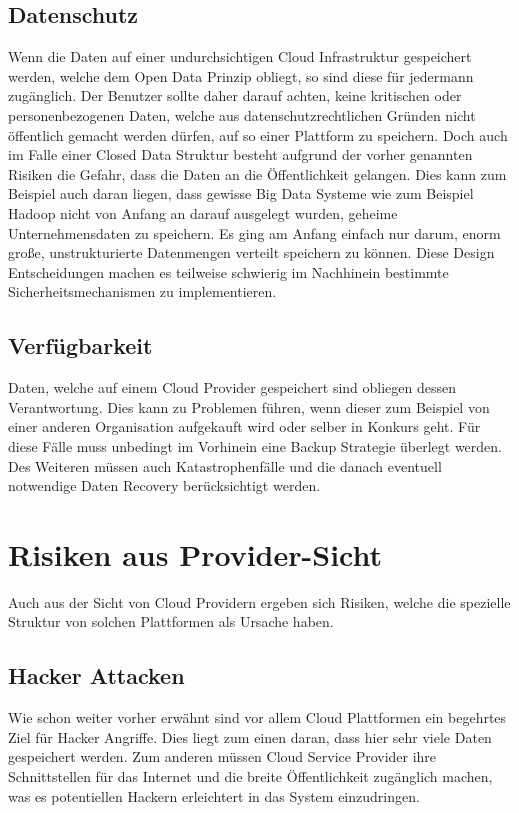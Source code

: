 \documentclass[a4paper,11pt]{article}
\begin{document}
\subsection{Datenschutz}
Wenn die Daten auf einer undurchsichtigen Cloud Infrastruktur gespeichert werden, welche dem Open Data Prinzip obliegt, so sind diese für jedermann zugänglich. Der Benutzer sollte daher darauf achten, keine kritischen oder personenbezogenen Daten, welche aus datenschutzrechtlichen Gründen nicht öffentlich gemacht werden dürfen, auf so einer Plattform zu speichern. Doch auch im Falle einer Closed Data Struktur besteht aufgrund der vorher genannten Risiken die Gefahr, dass die Daten an die Öffentlichkeit gelangen. Dies kann zum Beispiel auch daran liegen, dass gewisse Big Data Systeme wie zum Beispiel Hadoop nicht von Anfang an darauf ausgelegt wurden, geheime Unternehmensdaten zu speichern. Es ging am Anfang einfach nur darum, enorm große, unstrukturierte Datenmengen verteilt speichern zu können. Diese Design Entscheidungen machen es teilweise schwierig im Nachhinein bestimmte Sicherheitsmechanismen zu implementieren. \cite{haa2013}

\subsection{Verfügbarkeit}
Daten, welche auf einem Cloud Provider gespeichert sind obliegen dessen Verantwortung. Dies kann zu Problemen führen, wenn dieser zum Beispiel von einer anderen Organisation aufgekauft wird oder selber in Konkurs geht. Für diese Fälle muss unbedingt im Vorhinein eine Backup Strategie überlegt werden. Des Weiteren müssen auch Katastrophenfälle und die danach eventuell notwendige Daten Recovery berücksichtigt werden. \cite{mos2011}

\section{Risiken aus Provider-Sicht}
Auch aus der Sicht von Cloud Providern ergeben sich Risiken, welche die spezielle Struktur von solchen Plattformen als Ursache haben.

\subsection{Hacker Attacken}
Wie schon weiter vorher erwähnt sind vor allem Cloud Plattformen ein begehrtes Ziel für Hacker Angriffe. Dies liegt zum einen daran, dass hier sehr viele Daten gespeichert werden. Zum anderen müssen Cloud Service Provider ihre Schnittstellen für das Internet und die breite Öffentlichkeit zugänglich machen, was es potentiellen Hackern erleichtert in das System einzudringen. \cite{mos2011}
\end{document}

